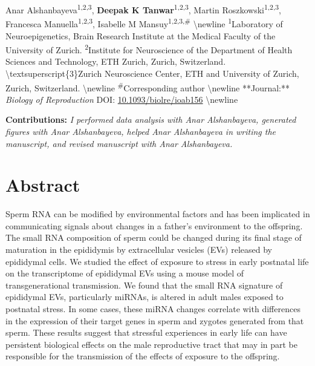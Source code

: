 \documentclass[12pt,twoside]{reedthesis}
\begin{document}
Anar Alshanbayeva\textsuperscript{1,2,3}, \textbf{Deepak K
Tanwar}\textsuperscript{1,2,3}, Martin
Roszkowski\textsuperscript{1,2,3}, Francesca
Manuella\textsuperscript{1,2,3}, Isabelle M
Mansuy\textsuperscript{1,2,3,\#} \newline \textbackslash newline
\textsuperscript{1}Laboratory of Neuroepigenetics, Brain Research
Institute at the Medical Faculty of the University of Zurich. \newline
\textsuperscript{2}Institute for Neuroscience of the Department of
Health Sciences and Technology, ETH Zurich, Zurich, Switzerland.
\newline \textbackslash textsuperscript\{3\}Zurich Neuroscience Center, ETH and
University of Zurich, Zurich, Switzerland. \newline \textbackslash newline
\textsuperscript{\#}Corresponding author \newline \textbackslash newline
**Journal:** \emph{Biology of Reproduction} \newline DOI:
\href{https://doi.org/10.1093/biolre/ioab156}{10.1093/biolre/ioab156}
\newline \textbackslash newline

\textbf{Contributions:} \emph{I performed data analysis with Anar Alshanbayeva,
generated figures with Anar Alshanbayeva, helped Anar Alshanbayeva in
writing the manuscript, and revised manuscript with Anar Alshanbayeva.}

\newpage

\hypertarget{abstract-1}{%
\section{Abstract}\label{abstract-1}}

Sperm RNA can be modified by environmental factors and has been
implicated in communicating signals about changes in a father's
environment to the offspring. The small RNA composition of sperm could
be changed during its final stage of maturation in the epididymis by
extracellular vesicles (EVs) released by epididymal cells. We studied
the effect of exposure to stress in early postnatal life on the
transcriptome of epididymal EVs using a mouse model of transgenerational
transmission. We found that the small RNA signature of epididymal EVs,
particularly miRNAs, is altered in adult males exposed to postnatal
stress. In some cases, these miRNA changes correlate with differences in
the expression of their target genes in sperm and zygotes generated from
that sperm. These results suggest that stressful experiences in early
life can have persistent biological effects on the male reproductive
tract that may in part be responsible for the transmission of the
effects of exposure to the offspring.
\end{document}
